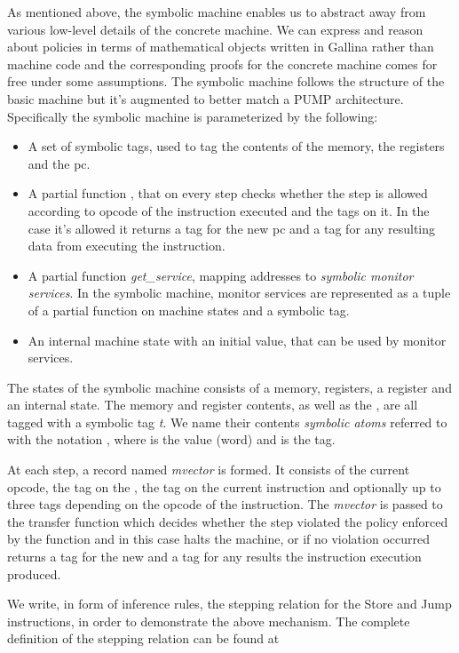 As mentioned above, the symbolic machine enables us to abstract away from 
various low-level details of the concrete machine. We can express and reason
about policies in terms of mathematical objects written in Gallina rather than
machine code and the corresponding proofs for the concrete machine comes for 
free under some assumptions. The symbolic machine follows the structure of the 
basic machine but it's augmented to better match a PUMP architecture. 
Specifically the symbolic machine is parameterized by the following:
\begin{itemize}
\item A set of symbolic tags, used to tag the contents of the memory, the
registers and the pc.
\item A partial function \TRANSFER, that on every step checks whether the
step is allowed according to opcode of the instruction executed and the tags on
it. In the case it's allowed it returns a tag for the new pc and a tag for any 
resulting data from executing the instruction.
\item A partial function \textit{get\_service}, mapping addresses to 
\textit{symbolic monitor services}. In the symbolic machine, monitor services
are represented as a tuple of a partial function on machine states and a
symbolic tag.
\item An internal machine state with an initial value, that can be used by 
monitor services.
\end{itemize}

The states of the symbolic machine consists of a memory, registers, a \pc 
register and an internal state.
The memory  and register contents, as well as the \pc, are all tagged with a
symbolic tag \textit{t}. We name their contents \textit{symbolic atoms} referred
to with the notation , where  is the value (word) and
 is the tag.

At each step, a record named \emph{mvector} is formed. It consists of the 
current opcode, the tag on the \pc, the tag on the current instruction and 
optionally up to three tags depending on the opcode of the instruction.
The \emph{mvector} is passed to the transfer function
which decides whether the step violated the policy enforced by the \TRANSFER
function and in this case halts the machine, or if no violation occurred returns
a tag for the new \pc and a tag for any results the instruction execution 
produced.

We write, in form of inference rules, the stepping relation for the Store and 
Jump instructions, in order to demonstrate the above mechanism. The complete
definition of the stepping relation can be found at 

